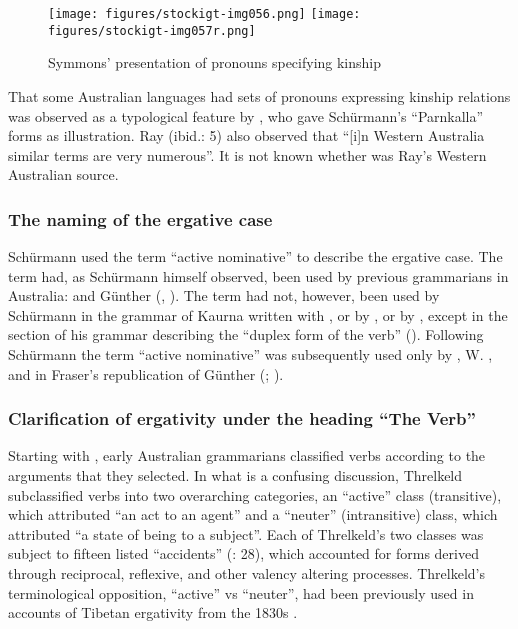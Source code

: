 \begin{figure}
\texttt{[image: figures/stockigt-img056.png]}
\texttt{[image: figures/stockigt-img057r.png]}
\caption{Symmons' presentation of pronouns specifying kinship \citeyearpar[xiv-xv]{symmons_grammatical_1841}}
\label{fig:key:111}
\end{figure}

That some Australian languages had sets of pronouns expressing kinship relations was observed as a typological feature by \citet[5]{ray_aboriginal_1925}, who gave Schürmann’s “Parnkalla” forms as illustration. Ray (ibid.: 5) also observed that “[i]n Western Australia similar terms are very numerous”. It is not known whether \citet{symmons_grammatical_1841} was Ray’s Western Australian source.

\subsubsection{The naming of the ergative case}
\label{sec:key:6.2.1.5}

Schürmann used the term “active nominative” to describe the ergative case. The term had, as Schürmann himself observed, been used by previous grammarians in Australia: \citet{threlkeld_australian_1834} and Günther (\citeyear{gunther_native_1838}, \citeyear{gunther_lecture_1840}). The term had not, however, been used by Schürmann in the grammar of Kaurna written with \citet{teichelmann_outlines_1840}, or by \citet{symmons_grammatical_1841}, or by \citet{meyer_vocabulary_1843}, except in the section of his grammar describing the “duplex form of the verb” (). Following Schürmann the term “active nominative” was subsequently used only by \citet{moorhouse_vocabulary_1846}, W. \citet{bleek_library_1858}, and in Fraser’s republication of Günther (\citeyear{gunther_grammar_1892}; ).

\subsubsection{Clarification of ergativity under the heading ``The Verb''}
\label{sec:key:6.2.1.6}\label{bkm:Ref336283270}\label{bkm:Ref336350800}
\largerpage

Starting with \citet{Threlkeld1834}, early Australian grammarians classified verbs according to the arguments that they selected. In what is a confusing discussion, Threlkeld subclassified verbs into two overarching categories, an “active” class (transitive), which attributed “an act to an agent” and a “neuter” (intransitive) class, which attributed ``a state of being to a subject''. Each of Threlkeld’s two classes was subject to fifteen listed “accidents” (\citeyear{threlkeld_australian_1834}: 28), which accounted for forms derived through reciprocal, reflexive, and other valency altering processes. Threlkeld’s terminological opposition, “active” vs “neuter”, had been previously used in accounts of Tibetan ergativity from the 1830s \citep[130]{vollmann_descriptions_2008}.

